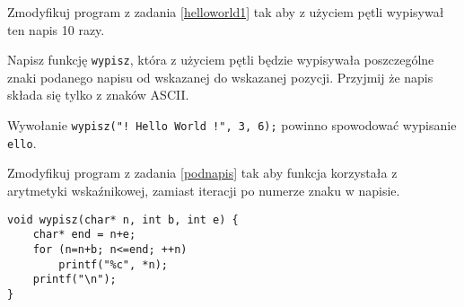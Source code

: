 \dbEntryCheckResults
Zmodyfikuj program z zadania \ref{helloworld1} tak aby z użyciem pętli wypisywał ten napis 10 razy.
\fi

\dbEntryCheckResults
Napisz funkcję \Verb#wypisz#, która z użyciem pętli będzie wypisywała poszczególne znaki podanego napisu od wskazanej do wskazanej pozycji. Przyjmij że napis składa się tylko z znaków ASCII.

Wywołanie \Verb#wypisz("! Hello World !", 3, 6);# powinno spowodować wypisanie \Verb#ello#.
\fi

\dbEntryCheckResults
Zmodyfikuj program z zadania \ref{podnapis} tak aby funkcja korzystała z arytmetyki wskaźnikowej, zamiast iteracji po numerze znaku w napisie.
\fi

\dbEntryCheckResults
\begin{verbatim}
void wypisz(char* n, int b, int e) {
	char* end = n+e;
	for (n=n+b; n<=end; ++n)
		printf("%c", *n);
	printf("\n");
}
\end{verbatim}
\fi

